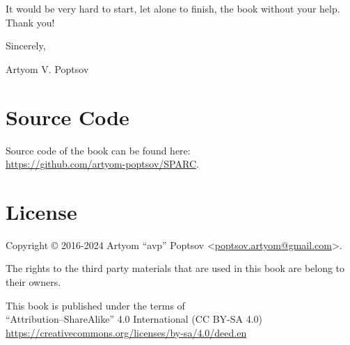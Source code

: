 \documentclass[../sparc.tex]{subfiles}
\begin{document}
It would be very hard to start, let alone to finish, the book without your help.
Thank you!
\vspace{5mm}

\hspace{1cm}Sincerely,

\hspace{1cm}Artyom V. Poptsov

\section*{Source Code}

Source code of the book can be found here: \\
\url{https://github.com/artyom-poptsov/SPARC}.

\section*{License}

Copyright © 2016-2024 Artyom ``avp'' Poptsov
<\href{mailto:poptsov.artyom@gmail.com}{poptsov.artyom@gmail.com}>.

The rights to the third party materials that are used in this book are belong to
their owners.

This book is published under the terms of \\ ``Attribution--ShareAlike'' 4.0
International (CC BY-SA 4.0)
\\ \url{https://creativecommons.org/licenses/by-sa/4.0/deed.en}
\end{document}
